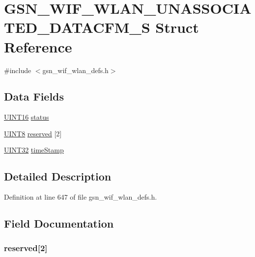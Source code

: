 \hypertarget{a00414}{
\section{GSN\_\-WIF\_\-WLAN\_\-UNASSOCIATED\_\-DATACFM\_\-S Struct Reference}
\label{a00414}
}


{\ttfamily \#include $<$gsn\_\-wif\_\-wlan\_\-defs.h$>$}

\subsection*{Data Fields}
\begin{DoxyCompactItemize}
\item 
\hyperlink{a00660_ga09f1a1fb2293e33483cc8d44aefb1eb1}{UINT16} \hyperlink{a00414_ae425f6f53cf8bd844de7aefd5a15798a}{status}
\item 
\hyperlink{a00660_gab27e9918b538ce9d8ca692479b375b6a}{UINT8} \hyperlink{a00414_a62155e2c7aa25a55ae2f37c10b06c5b4}{reserved} \mbox{[}2\mbox{]}
\item 
\hyperlink{a00660_gae1e6edbbc26d6fbc71a90190d0266018}{UINT32} \hyperlink{a00414_ae7eca8d649117ff5c69fbfcfa178898f}{timeStamp}
\end{DoxyCompactItemize}


\subsection{Detailed Description}


Definition at line 647 of file gsn\_\-wif\_\-wlan\_\-defs.h.



\subsection{Field Documentation}
\hypertarget{a00414_a62155e2c7aa25a55ae2f37c10b06c5b4}{
\subsubsection[{reserved}]{ {\bf reserved}\mbox{[}2\mbox{]}}}
\label{a00414_a62155e2c7aa25a55ae2f37c10b06c5b4}


